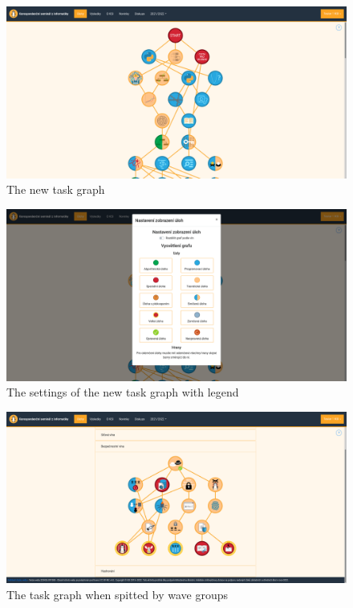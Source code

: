 \documentclass[
  digital, %
  oneside, %
  lof,     %
  nolot,     %
]{fithesis4}
\begin{document}
{\begin{figure}
\includegraphics[width=\textwidth]{assets/img/graph_new}
\caption{The new task graph}
\label{fig:graph-new}
\end{figure}

\begin{figure}
\includegraphics[width=\textwidth]{assets/img/graph_newsettings}
\caption{The settings of the new task graph with legend}
\label{fig:graph-new-settings}
\end{figure}

\begin{figure}
\includegraphics[width=\textwidth]{assets/img/graph_split}
\caption{The task graph when spitted by wave groups}
\label{fig:graph-split}
\end{figure}

}
\end{document}

